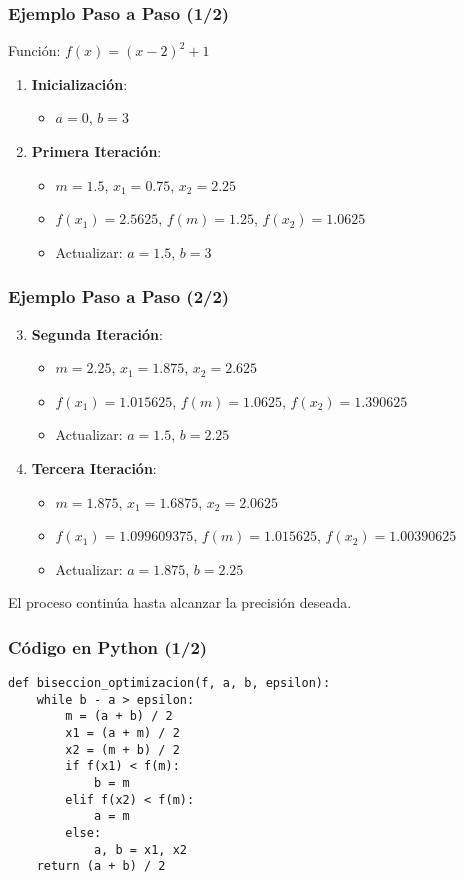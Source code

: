 \documentclass{beamer}
\begin{document}
\begin{frame}[fragile]
\frametitle{Ejemplo Paso a Paso (1/2)}
Función: $f(x) = (x - 2)^2 + 1$
\begin{enumerate}
    \item \textbf{Inicialización}:
    \begin{itemize}
        \item $a = 0$, $b = 3$
    \end{itemize}
    \item \textbf{Primera Iteración}:
    \begin{itemize}
        \item $m = 1.5$, $x_1 = 0.75$, $x_2 = 2.25$
        \item $f(x_1) = 2.5625$, $f(m) = 1.25$, $f(x_2) = 1.0625$
        \item Actualizar: $a = 1.5$, $b = 3$
    \end{itemize}
\end{enumerate}
\end{frame}

\begin{frame}
\frametitle{Ejemplo Paso a Paso (2/2)}
\begin{enumerate}\setcounter{enumi}{2}
    \item \textbf{Segunda Iteración}:
    \begin{itemize}
        \item $m = 2.25$, $x_1 = 1.875$, $x_2 = 2.625$
        \item $f(x_1) = 1.015625$, $f(m) = 1.0625$, $f(x_2) = 1.390625$
        \item Actualizar: $a = 1.5$, $b = 2.25$
    \end{itemize}
    \item \textbf{Tercera Iteración}:
    \begin{itemize}
        \item $m = 1.875$, $x_1 = 1.6875$, $x_2 = 2.0625$
        \item $f(x_1) = 1.099609375$, $f(m) = 1.015625$, $f(x_2) = 1.00390625$
        \item Actualizar: $a = 1.875$, $b = 2.25$
    \end{itemize}
\end{enumerate}


El proceso continúa hasta alcanzar la precisión deseada.
\end{frame}


\begin{frame}[fragile]
\frametitle{Código en Python (1/2)}
\begin{verbatim}
def biseccion_optimizacion(f, a, b, epsilon):
    while b - a > epsilon:
        m = (a + b) / 2
        x1 = (a + m) / 2
        x2 = (m + b) / 2
        if f(x1) < f(m):
            b = m
        elif f(x2) < f(m):
            a = m
        else:
            a, b = x1, x2
    return (a + b) / 2
\end{verbatim}
\end{frame}
\end{document}
